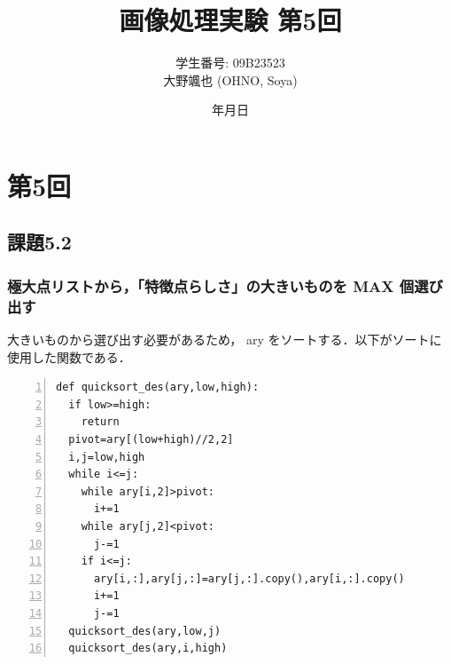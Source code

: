 \documentclass[autodetect-engine,dvi=dvipdfmx,ja=standard,
               a4j,11pt]{bxjsarticle}
\title{画像処理実験 第5回}
\author{学生番号: 09B23523\\
        大野颯也 (OHNO, Soya)}
\date{\number\year 年\number\month 月\number\day 日}
\begin{document}
\maketitle











\section{第5回} \label{sec:abstract}
\subsection{課題5.2}
\subsubsection{極大点リストから，「特徴点らしさ」の大きいものを MAX 個選び出す}
大きいものから選び出す必要があるため， ary をソートする．以下がソートに使用した関数である．

\begin{Verbatim}[numbers=left, xleftmargin=10mm, numbersep=6pt,
                    fontsize=\small, baselinestretch=0.8]
def quicksort_des(ary,low,high):
  if low>=high:
    return
  pivot=ary[(low+high)//2,2]
  i,j=low,high
  while i<=j:
    while ary[i,2]>pivot:
      i+=1
    while ary[j,2]<pivot:
      j-=1
    if i<=j:
      ary[i,:],ary[j,:]=ary[j,:].copy(),ary[i,:].copy()
      i+=1
      j-=1
  quicksort_des(ary,low,j)
  quicksort_des(ary,i,high)
\end{Verbatim}
\end{document}
